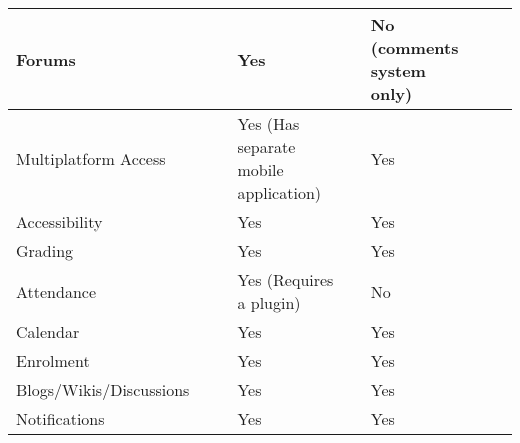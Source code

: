 \begin{table}[ht]
{\begin{tabular}{llllllll}
        \multicolumn{1}{|l|}{Forums}                      & \multicolumn{1}{l|}{} & \multicolumn{1}{l|}{} & \multicolumn{1}{l|}{Yes} & \multicolumn{1}{l|}{} & \multicolumn{1}{l|}{No (comments system only)} & \multicolumn{1}{l|}{} & \multicolumn{1}{l|}{} \\ \hline
        \multicolumn{1}{|l|}{Multiplatform Access}        & \multicolumn{1}{l|}{} & \multicolumn{1}{l|}{} & \multicolumn{1}{l|}{Yes (Has separate mobile application)} & \multicolumn{1}{l|}{} & \multicolumn{1}{l|}{Yes}                       & \multicolumn{1}{l|}{} & \multicolumn{1}{l|}{} \\ \hline
        \multicolumn{1}{|l|}{Accessibility}               & \multicolumn{1}{l|}{} & \multicolumn{1}{l|}{} & \multicolumn{1}{l|}{Yes} & \multicolumn{1}{l|}{} & \multicolumn{1}{l|}{Yes}                       & \multicolumn{1}{l|}{} & \multicolumn{1}{l|}{} \\ \hline
        \multicolumn{1}{|l|}{Grading}                     & \multicolumn{1}{l|}{} & \multicolumn{1}{l|}{} & \multicolumn{1}{l|}{Yes} & \multicolumn{1}{l|}{} & \multicolumn{1}{l|}{Yes}                       & \multicolumn{1}{l|}{} & \multicolumn{1}{l|}{} \\ \hline
        \multicolumn{1}{|l|}{Attendance}                  & \multicolumn{1}{l|}{} & \multicolumn{1}{l|}{} & \multicolumn{1}{l|}{Yes (Requires a plugin)} & \multicolumn{1}{l|}{} & \multicolumn{1}{l|}{No}                        & \multicolumn{1}{l|}{} & \multicolumn{1}{l|}{} \\ \hline
        \multicolumn{1}{|l|}{Calendar}                    & \multicolumn{1}{l|}{} & \multicolumn{1}{l|}{} & \multicolumn{1}{l|}{Yes} & \multicolumn{1}{l|}{} & \multicolumn{1}{l|}{Yes}                       & \multicolumn{1}{l|}{} & \multicolumn{1}{l|}{} \\ \hline
        \multicolumn{1}{|l|}{Enrolment}                   & \multicolumn{1}{l|}{} & \multicolumn{1}{l|}{} & \multicolumn{1}{l|}{Yes} & \multicolumn{1}{l|}{} & \multicolumn{1}{l|}{Yes}                       & \multicolumn{1}{l|}{} & \multicolumn{1}{l|}{} \\ \hline
        \multicolumn{1}{|l|}{Blogs/Wikis/Discussions}     & \multicolumn{1}{l|}{} & \multicolumn{1}{l|}{} & \multicolumn{1}{l|}{Yes} & \multicolumn{1}{l|}{} & \multicolumn{1}{l|}{Yes}                       & \multicolumn{1}{l|}{} & \multicolumn{1}{l|}{} \\ \hline
        \multicolumn{1}{|l|}{Notifications}               & \multicolumn{1}{l|}{} & \multicolumn{1}{l|}{} & \multicolumn{1}{l|}{Yes} & \multicolumn{1}{l|}{} & \multicolumn{1}{l|}{Yes}                       & \multicolumn{1}{l|}{} & \multicolumn{1}{l|}{} \\ \hline

\end{tabular}}
\end{table}

